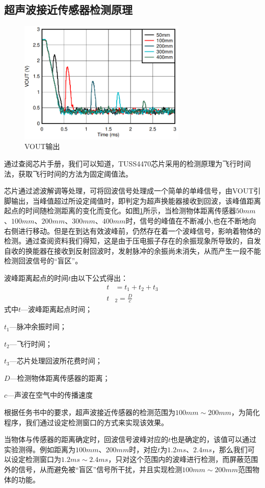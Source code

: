 \subsection{超声波接近传感器检测原理}
\begin{figure}[!h]
	\centering
	\includegraphics[width=8cm]{figure/VOUT image.png}
	\caption{VOUT输出}
	\label{VOUT输出}
\end{figure}\par
通过查阅芯片手册，我们可以知道，TUSS4470芯片采用的检测原理为飞行时间法，获取飞行时间的方法为固定阈值法。\par
芯片通过滤波解调等处理，可将回波信号处理成一个简单的单峰信号，由VOUT引脚输出，当峰值超过所设定阈值时，即判定为超声换能器接收到回波，该峰值距离起点的时间随检测距离的变化而变化。如图\ref{VOUT输出}所示，当检测物体距离传感器$50mm$、$100mm$、$200mm$、$300mm$、$400mm$时，信号的峰值在不断减小,也在不断地向右侧进行移动。但是在到达有效波峰前，仍然存在着一个波峰信号，影响着物体的检测。通过查阅资料我们得知，这是由于压电振子存在的余振现象所导致的，自发自收的换能器在接收到反射回波时，发射脉冲的余振尚未消失，从而产生一段不能检测回波信号的“盲区”。\par
波峰距离起点的时间$t$由以下公式得出：       
\begin{align}
	t&=t_1+t_2+t_3 \\
	t&_2=\frac{D}{c}
	\label{检测周期公式}
\end{align}  
式中\quad$t$---波峰距离起点时间；\par
\quad$t_1$---脉冲余振时间；\par
\quad$t_2$---飞行时间；\par    
\quad$t_3$---芯片处理回波所花费时间；\par 
\quad$D$---检测物体距离传感器的距离；\par  
\quad$c$---声波在空气中的传播速度\par    
根据任务书中的要求，超声波接近传感器的检测范围为$100mm\sim200mm$，为简化程序，我们通过设定检测窗口的方式来实现该效果。\par  
当物体与传感器的距离确定时，回波信号波峰对应的$t$也是确定的，该值可以通过实验测得。例如距离为$100mm$、$200mm$时，对应$t$为$1.2ms$、$2.4ms$，那么我们可以设定检测窗口为$1.2ms\sim2.4ms$，只对这个范围内的波峰进行检测，而屏蔽范围外的信号，从而避免被“盲区”信号所干扰，并且实现检测$100mm\sim200mm$范围物体的功能。\par
